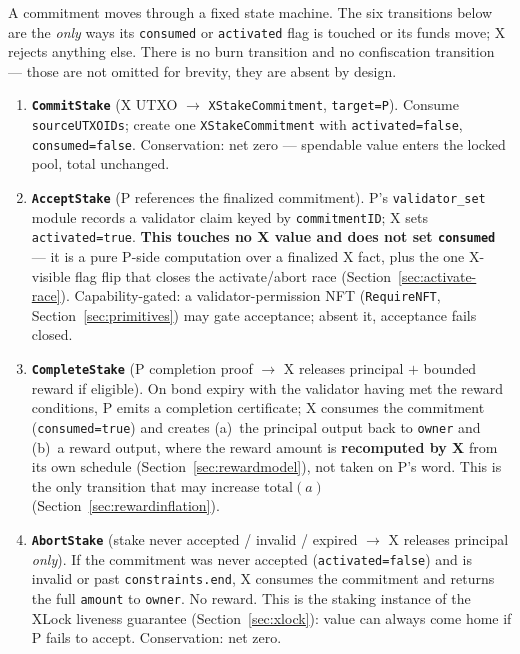 A commitment moves through a fixed state machine. The six transitions
below are the \emph{only} ways its \texttt{consumed} or \texttt{activated}
flag is touched or its funds move; X rejects anything else. There is no
burn transition and no confiscation transition --- those are not omitted
for brevity, they are absent by design.

\begin{enumerate}[leftmargin=2.4em,label=\textbf{T\arabic*.}]
\item \textbf{\texttt{CommitStake}} \;(X UTXO $\to$
  \texttt{XStakeCommitment}, \texttt{target=P}).
  Consume \texttt{sourceUTXOIDs}; create one \texttt{XStakeCommitment}
  with \texttt{activated=false}, \texttt{consumed=false}. Conservation:
  net zero --- spendable value enters the locked pool, total unchanged.

\item \textbf{\texttt{AcceptStake}} \;(P references the finalized
  commitment). P's \texttt{validator\_set} module records a validator
  claim keyed by \texttt{commitmentID}; X sets \texttt{activated=true}.
  \textbf{This touches no X value and does not set \texttt{consumed}} ---
  it is a pure P-side computation over a finalized X fact, plus the one
  X-visible flag flip that closes the activate/abort race
  (Section~\ref{sec:activate-race}). Capability-gated: a
  validator-permission NFT (\texttt{RequireNFT},
  Section~\ref{sec:primitives}) may gate acceptance; absent it,
  acceptance fails closed.

\item \textbf{\texttt{CompleteStake}} \;(P completion proof $\to$ X
  releases principal $+$ bounded reward if eligible). On bond expiry
  with the validator having met the reward conditions, P emits a
  completion certificate; X consumes the commitment
  (\texttt{consumed=true}) and creates (a)~the principal output back to
  \texttt{owner} and (b)~a reward output, where the reward amount is
  \textbf{recomputed by X} from its own schedule
  (Section~\ref{sec:rewardmodel}), not taken on P's word. This is the
  only transition that may increase $\mathrm{total}(a)$
  (Section~\ref{sec:rewardinflation}).

\item \textbf{\texttt{AbortStake}} \;(stake never accepted / invalid /
  expired $\to$ X releases principal \emph{only}). If the commitment was
  never accepted (\texttt{activated=false}) and is invalid or past
  \texttt{constraints.end}, X consumes the commitment and returns the
  full \texttt{amount} to \texttt{owner}. No reward. This is the staking
  instance of the XLock liveness guarantee
  (Section~\ref{sec:xlock}): value can always come home if P fails to
  accept. Conservation: net zero.


\end{enumerate}
